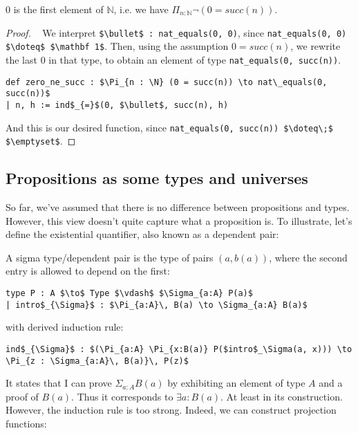 \documentclass[a4paper, 12pt]{article}
\newcommand{\N}{\mathbb{N}}
\theoremstyle{changedot}
\theoremstyle{changedotbreak}
\theoremstyle{nonumberplain}
\newtheorem{proof}{Proof}
\begin{document}
\begin{theorem}\label{thm:zero_ne_succ}
  $0$ is the first element of $\N$, i.e. we have $\Pi_{n:\N} \neg(0 = succ(n))$.
\end{theorem}
\begin{proof}~
  We interpret \lstinline{$\bullet$ : nat_equals(0, 0)}, since \lstinline{nat_equals(0, 0) $\doteq$ $\mathbf 1$}. Then, using the assumption $0 = succ(n)$, we rewrite the last $0$ in that type, to obtain an element of type \lstinline{nat_equals(0, succ(n))}.

\begin{lstlisting}[mathescape=true]
def zero_ne_succ : $\Pi_{n : \N} (0 = succ(n)) \to nat\_equals(0, succ(n))$
| n, h := ind$_{=}$(0, $\bullet$, succ(n), h)
\end{lstlisting}
  And this is our desired function, since \lstinline{nat_equals(0, succ(n)) $\doteq\;$ $\emptyset$}.
\end{proof}

\subsection{Propositions as some types and universes}
So far, we've assumed that there is no difference between propositions and types. However, this view doesn't quite capture what a proposition is. To illustrate, let's define the existential quantifier, also known as a dependent pair:

\begin{definition}
  A sigma type/dependent pair is the type of pairs $(a, b(a))$, where the second entry is allowed to depend on the first:

\begin{lstlisting}
type P : A $\to$ Type $\vdash$ $\Sigma_{a:A} P(a)$
| intro$_{\Sigma}$ : $\Pi_{a:A}\, B(a) \to \Sigma_{a:A} B(a)$
\end{lstlisting}

  with derived induction rule:

\begin{lstlisting}
ind$_{\Sigma}$ : $(\Pi_{a:A} \Pi_{x:B(a)} P($intro$_\Sigma(a, x))) \to \Pi_{z : \Sigma_{a:A}\, B(a)}\, P(z)$
\end{lstlisting}
\end{definition}

It states that I can prove $\Sigma_{a:A}B(a)$ by exhibiting an element of type $A$ and a proof of $B(a)$. Thus it corresponds to $\exists a: B(a)$. At least in its construction. However, the induction rule is too strong. Indeed, we can construct projection functions:
\end{document}
